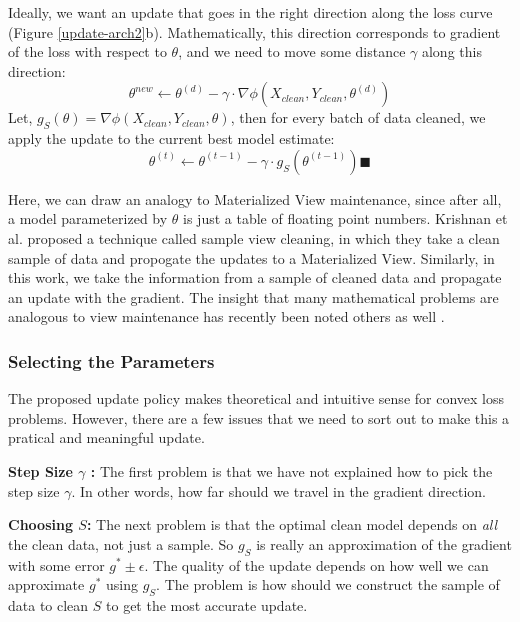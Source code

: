 Ideally, we want an update that goes in the right direction along the loss curve (Figure \ref{update-arch2}b).
Mathematically, this direction corresponds to gradient of the loss with respect to $\theta$, and we need to move some distance $\gamma$ along this direction:
\[
\theta^{new} \leftarrow \theta^{(d)} - \gamma \cdot \nabla\phi(X_{clean},Y_{clean},\theta^{(d)})
\]
Let, $g_{S}(\theta) = \nabla\phi(X_{clean},Y_{clean},\theta)$, then for every batch of data cleaned, we apply the update to the current best model estimate:
\[
\theta^{(t)} \leftarrow \theta^{(t-1)} - \gamma \cdot g_{S}(\theta^{(t-1)}) \blacksquare
\]

Here, we can draw an analogy to Materialized View maintenance, since after all, a model parameterized by $\theta$ is just a table of floating point numbers.
Krishnan et al. proposed a technique called sample view cleaning, in which they take a clean sample of data and propogate the updates to a Materialized View.
Similarly, in this work, we take the information from a sample of cleaned data and propagate an update with the gradient.
The insight that many mathematical problems are analogous to view maintenance has recently been noted others as well \cite{nikolic2014linview}. 

\subsubsection{Selecting the Parameters}
The proposed update policy makes theoretical and intuitive sense for convex loss problems.
However, there are a few issues that we need to sort out to make this a pratical and meaningful update.

\vspace{0.5em}

\noindent\textbf{Step Size $\gamma$ : } The first problem is that we have not explained how to pick the step size $\gamma$. In other words, how far should we travel in the gradient direction.

\vspace{0.5em}

\noindent\textbf{Choosing $S$: } The next problem is that the optimal clean model depends on \emph{all} the clean data, not just a sample. 
So $g_S$ is really an approximation of the gradient with some error $g^* \pm \epsilon$. 
The quality of the update depends on how well we can approximate $g^*$ using $g_S$.
The problem is how should we construct the sample of data to clean $S$ to get the most accurate update.

